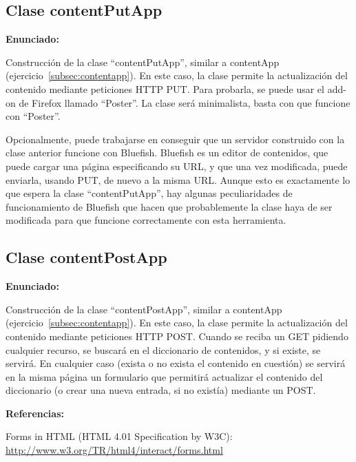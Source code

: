 \subsection{Clase contentPutApp}
\label{subsec:contentputapp}

\textbf{Enunciado:}

Construcción de la clase ``contentPutApp'', similar a contentApp (ejercicio~\ref{subsec:contentapp}). En este caso, la clase permite la actualización del contenido mediante peticiones HTTP PUT. Para probarla, se puede usar el add-on de Firefox llamado ``Poster''. La clase será minimalista, basta con que funcione con ``Poster''.

Opcionalmente, puede trabajarse en conseguir que un servidor construido con la clase anterior funcione con Bluefish. Bluefish es un editor de contenidos, que puede cargar una página especificando su URL, y que una vez modificada, puede enviarla, usando PUT, de nuevo a la misma URL. Aunque esto es exactamente lo que espera la clase ``contentPutApp'', hay algunas peculiaridades de funcionamiento de Bluefish que hacen que probablemente la clase haya de ser modificada para que funcione correctamente con esta herramienta.

\subsection{Clase contentPostApp}
\label{subsec:contentpostapp}

\textbf{Enunciado:}

Construcción de la clase ``contentPostApp'', similar a contentApp (ejercicio~\ref{subsec:contentapp}). En este caso, la clase permite la actualización del contenido mediante peticiones HTTP POST. Cuando se reciba un GET pidiendo cualquier recurso, se buscará en el diccionario de contenidos, y si existe, se servirá. En cualquier caso (exista o no exista el contenido en cuestión) se servirá en la misma página un formulario que permitirá actualizar el contenido del diccionario (o crear una nueva entrada, si no existía) mediante un POST.

\textbf{Referencias:}

Forms in HTML (HTML 4.01 Specification by W3C): \\
\url{http://www.w3.org/TR/html4/interact/forms.html}


